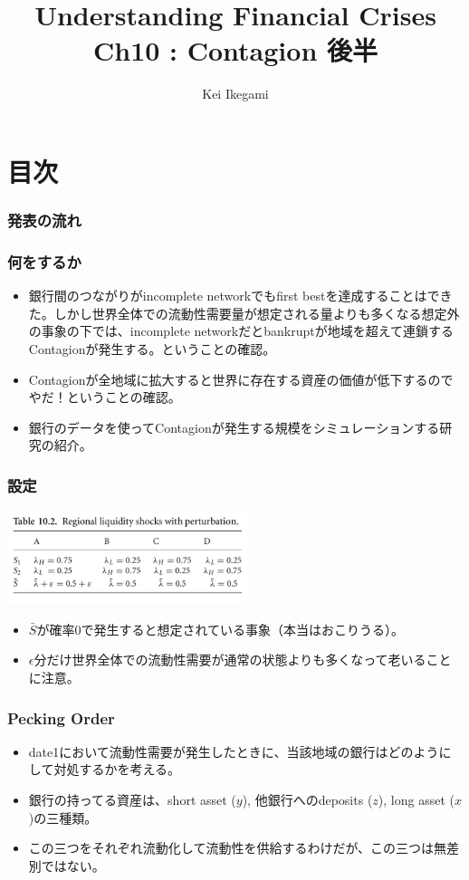 \documentclass[dvipdfmx, 12pt]{beamer}
\title{Understanding Financial Crises\\Ch10 : Contagion 後半}
\author{Kei Ikegami}
\begin{document}
\newcommand{\argmin}{\mathop{\rm arg~min}\limits}

\frame{\maketitle}

\section*{目次}
\begin{frame} \frametitle{発表の流れ}
\tableofcontents
\end{frame}

\begin{frame}\frametitle{何をするか}
	\begin{itemize}
	\item 銀行間のつながりがincomplete networkでもfirst bestを達成することはできた。しかし世界全体での流動性需要量が想定される量よりも多くなる想定外の事象の下では、incomplete networkだとbankruptが地域を超えて連鎖するContagionが発生する。ということの確認。
	\item Contagionが全地域に拡大すると世界に存在する資産の価値が低下するのでやだ！ということの確認。
	\item 銀行のデータを使ってContagionが発生する規模をシミュレーションする研究の紹介。
	\end{itemize}
\end{frame}

\begin{frame}\frametitle{設定}
	\includegraphics[width = 7cm]{10-2.png}
	
	\begin{itemize}
	\item $\bar{S}$が確率0で発生すると想定されている事象（本当はおこりうる）。
	\item $\epsilon$分だけ世界全体での流動性需要が通常の状態よりも多くなって老いることに注意。
	\end{itemize}
\end{frame}

\begin{frame}\frametitle{Pecking Order}
	\begin{itemize}
	\item date1において流動性需要が発生したときに、当該地域の銀行はどのようにして対処するかを考える。
	\item 銀行の持ってる資産は、short asset ($y$), 他銀行へのdeposits ($z$), long asset ($x$)の三種類。
	\item この三つをそれぞれ流動化して流動性を供給するわけだが、この三つは無差別ではない。
	\end{itemize}
\end{frame}
\end{document}
